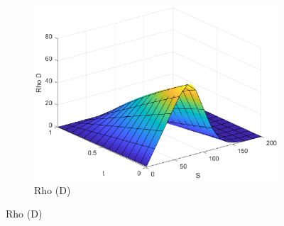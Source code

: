 \begin{figure}[H]
\begin{subfigure}[b]{0.35\linewidth}
        \includegraphics[width=\linewidth]{Imagenes/6_Sols/Put/Put_Rho_D.eps}
        \caption{Rho (D)}
    \end{subfigure}
\end{figure}



